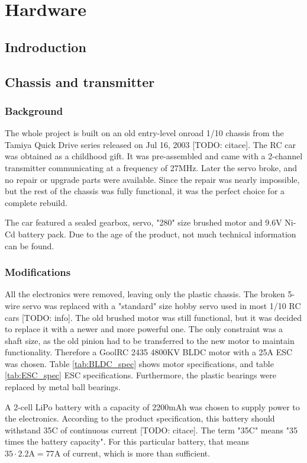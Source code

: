 


\chapter{Hardware}
\label{chap:hw}
\section{Indroduction}
\label{sec:hw_intro}


\section{Chassis and transmitter}
\label{sec:hw_base}
\subsection{Background}
The whole project is built on an old entry-level onroad 1/10 chassis from the Tamiya Quick Drive series released on Jul 16, 2003 [TODO: citace]. The RC car was obtained as a childhood gift. It was pre-assembled and came with a 2-channel transmitter communicating at a frequency of 27MHz. Later the servo broke, and no repair or upgrade parts were available. Since the repair was nearly impossible, but the rest of the chassis was fully functional, it was the perfect choice for a complete rebuild.

The car featured a sealed gearbox, servo, "280" size brushed motor and 9.6V Ni-Cd battery pack. Due to the age of the product, not much technical information can be found. %

\subsection{Modifications}
All the electronics were removed, leaving only the plastic chassis. The broken 5-wire servo was replaced with a "standard" size hobby servo used in most 1/10 RC cars [TODO: info]. The old brushed motor was still functional, but it was decided to replace it with a newer and more powerful one. The only constraint was a shaft size, as the old pinion had to be transferred to the new motor to maintain functionality. Therefore a GoolRC 2435 4800KV BLDC motor with a 25A ESC was chosen.  Table \ref{tab:BLDC_spec} shows motor specifications, and table \ref{tab:ESC_spec} ESC specifications. Furthermore, the plastic bearings were replaced by metal ball bearings. %

A 2-cell LiPo battery with a capacity of 2200mAh was chosen to supply power to the electronics. According to the product specification, this battery should withstand 35C of continuous current [TODO: citace]. The term "35C" means "35 times the battery capacity". For this particular battery, that means $35 \cdot 2.2\unit{\A} = 77\unit{\A}$ of current, which is more than sufficient.

